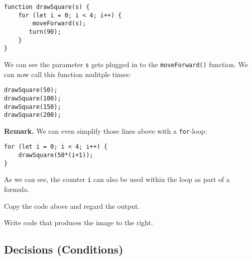 \documentclass[11pt,a4paper]{report}
\begin{document}
\begin{verbatim}
function drawSquare(s) {
    for (let i = 0; i < 4; i++) {
        moveForward(s);
       turn(90);
    }
}
\end{verbatim}
We can see the parameter \verb|s| gets plugged in to the \verb|moveForward()| function. We can now call this function mulitple times: 
\begin{verbatim}
drawSquare(50);
drawSquare(100);
drawSquare(150);
drawSquare(200);
\end{verbatim}

{\bf Remark. } We can even simplify those lines above with a \verb|for|-loop:
\begin{verbatim}
for (let i = 0; i < 4; i++) {
    drawSquare(50*(i+1));
}
\end{verbatim}

As we can see, the counter \verb|i| can also be used within the loop as part of a formula.
\begin{ex}
Copy the code above and regard the output.
\end{ex}

\begin{ex}
\begin{multicols}{2}
Write code that produces the image to the right.

\end{multicols}
\end{ex}





\subsection{Decisions (Conditions)}
\end{document}
